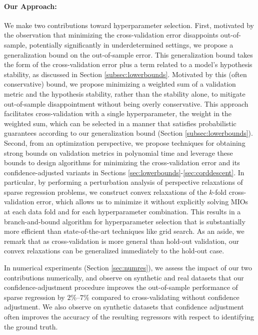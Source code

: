 \documentclass[mnsc,nonblindrev]{informs3} %
\begin{document}
\paragraph{Our Approach:} {\color{black}We make two %
contributions toward %
hyperparameter selection.%
}
{\color{black}
First, motivated by the observation that minimizing the {\color{black}cross-validation} error disappoints out-of-sample, potentially significantly in underdetermined settings, we propose a generalization bound on the out-of-sample error. This generalization bound takes the form of the cross-validation error plus a term related to a model's hypothesis stability, as discussed in Section \ref{subsec:lowerbounds}. Motivated by this (often conservative) bound, we propose minimizing a weighted sum of a validation metric and the hypothesis stability, rather than the stability alone, to mitigate out-of-sample disappointment without being overly conservative. This approach facilitates cross-validation with a single hyperparameter, the weight in the weighted sum, which can be selected in a manner that satisfies probabilistic guarantees according to our generalization bound (Section \ref{subsec:lowerbounds}).} Second, from an optimization perspective, we propose techniques for obtaining strong bounds on validation metrics in polynomial time and leverage these bounds to design algorithms for minimizing the {\color{black}cross-validation} error and its confidence-adjusted variants in Sections \ref{sec:lowerbounds}-\ref{sec:corddescent}. In particular, by performing a perturbation analysis of perspective relaxations of sparse regression problems, we construct convex relaxations of the $k$-fold cross-validation error, which allows us to minimize it without explicitly solving MIOs at each data fold and for each hyperparameter combination. This results in a branch-and-bound algorithm for hyperparameter selection that is substantially more efficient than state-of-the-art techniques like grid search. {\color{black}As an aside, we remark that as cross-validation is more general than hold-out validation, our convex relaxations can be generalized immediately to the hold-out case.}

In numerical experiments (Section \ref{sec:numres}), we assess the impact of our two contributions numerically, and observe on synthetic and real datasets that our confidence-adjustment procedure improves the out-of-sample performance of sparse regression by $2\%$--$7\%$ compared to cross-validating without confidence adjustment. We also observe on synthetic datasets that confidence adjustment often improves the accuracy of the resulting regressors with respect to identifying the ground truth. 
\end{document}

